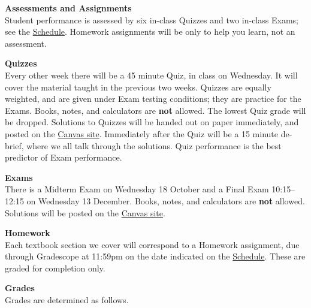 \documentclass[12pt]{article}
\renewcommand{\emph}[1]{\textsf{\textbf{#1}}}
\newcommand{\localhead}[1]{\par\smallskip\textbf{#1}\nobreak\\}%
\def\heading#1{\localhead{\large\emph{#1}}}
\def\subheading#1{\localhead{\emph{#1}}}
\begin{document}
\heading{Assessments and Assignments}
Student performance is assessed by six in-class Quizzes and two in-class Exams; see the \href{https://bueler.github.io/math302/assets/general/F23/schedule.pdf}{Schedule}.  Homework assignments will be only to help you learn, not an assessment.
 

\subheading{Quizzes}
Every other week there will be a 45 minute Quiz, in class on Wednesday.  It will cover the material taught in the previous two weeks.  Quizzes are equally weighted, and are given under Exam testing conditions; they are practice for the Exams.  Books, notes, and calculators are \emph{not} allowed.  The lowest Quiz grade will be dropped.  Solutions to Quizzes will be handed out on paper immediately, and posted on the \href{https://canvas.alaska.edu/courses/16214}{Canvas site}.  Immediately after the Quiz will be a 15 minute de-brief, where we all talk through the solutions.  Quiz performance is the best predictor of Exam performance.


\subheading{Exams}
There is a Midterm Exam on Wednesday 18 October and a Final Exam 10:15--12:15 on Wednesday 13 December.   Books, notes, and calculators are \emph{not} allowed.  Solutions will be posted on the \href{https://canvas.alaska.edu/courses/16214}{Canvas site}.


\subheading{Homework}
Each textbook section we cover will correspond to a Homework assignment, due through Gradescope at 11:59pm on the date indicated on the \href{https://bueler.github.io/math302/assets/general/F23/schedule.pdf}{Schedule}.  These are graded for completion only.


\heading{Grades}
Grades are determined as follows.
\end{document}
